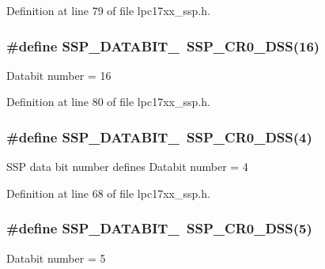 \-Definition at line 79 of file lpc17xx\-\_\-ssp.\-h.

\hypertarget{group___s_s_p___public___macros_ga8a5285b118c9dc1a7f2ce6c4caa3b962}{
\subsubsection[{\-S\-S\-P\-\_\-\-D\-A\-T\-A\-B\-I\-T\-\_\-16}]{\setlength{\rightskip}{0pt plus 5cm}\#define {\bf \-S\-S\-P\-\_\-\-D\-A\-T\-A\-B\-I\-T\-\_}~{\bf \-S\-S\-P\-\_\-\-C\-R0\-\_\-\-D\-S\-S}(16)}}\label{group___s_s_p___public___macros_ga8a5285b118c9dc1a7f2ce6c4caa3b962}
\-Databit number = 16 

\-Definition at line 80 of file lpc17xx\-\_\-ssp.\-h.

\hypertarget{group___s_s_p___public___macros_ga238b6583278a25eba784cc4084ecd87f}{
\subsubsection[{\-S\-S\-P\-\_\-\-D\-A\-T\-A\-B\-I\-T\-\_\-4}]{\setlength{\rightskip}{0pt plus 5cm}\#define {\bf \-S\-S\-P\-\_\-\-D\-A\-T\-A\-B\-I\-T\-\_}~{\bf \-S\-S\-P\-\_\-\-C\-R0\-\_\-\-D\-S\-S}(4)}}\label{group___s_s_p___public___macros_ga238b6583278a25eba784cc4084ecd87f}
\-S\-S\-P data bit number defines \-Databit number = 4 

\-Definition at line 68 of file lpc17xx\-\_\-ssp.\-h.

\hypertarget{group___s_s_p___public___macros_gaaab22a8bc9a3fdbf77451c0a71970f29}{
\subsubsection[{\-S\-S\-P\-\_\-\-D\-A\-T\-A\-B\-I\-T\-\_\-5}]{\setlength{\rightskip}{0pt plus 5cm}\#define {\bf \-S\-S\-P\-\_\-\-D\-A\-T\-A\-B\-I\-T\-\_}~{\bf \-S\-S\-P\-\_\-\-C\-R0\-\_\-\-D\-S\-S}(5)}}\label{group___s_s_p___public___macros_gaaab22a8bc9a3fdbf77451c0a71970f29}
\-Databit number = 5 

